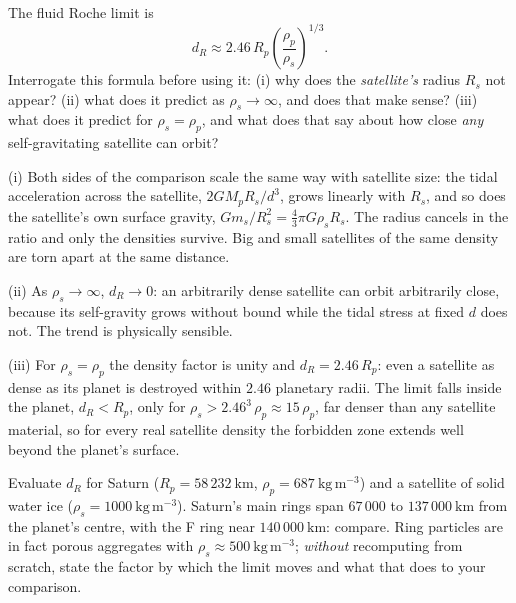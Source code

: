 \parti The fluid Roche limit is
\[
  d_R \approx 2.46\, R_p \left(\frac{\rho_p}{\rho_s}\right)^{1/3}.
\]
Interrogate this formula before using it: (i) why does the \emph{satellite's} radius $R_s$ not
appear? (ii) what does it predict as $\rho_s \to \infty$, and does that make sense? (iii) what
does it predict for $\rho_s = \rho_p$, and what does that say about how close \emph{any}
self-gravitating satellite can orbit?

\begin{solution}
(i) Both sides of the comparison scale the same way with satellite size: the tidal acceleration
across the satellite, $2 G M_p R_s / d^3$, grows linearly with $R_s$, and so does the satellite's
own surface gravity, $G m_s / R_s^2 = \tfrac{4}{3}\pi G \rho_s R_s$. The radius cancels in the
ratio and only the densities survive. Big and small satellites of the same density are torn apart
at the same distance.

(ii) As $\rho_s \to \infty$, $d_R \to 0$: an arbitrarily dense satellite can orbit arbitrarily
close, because its self-gravity grows without bound while the tidal stress at fixed $d$ does not.
The trend is physically sensible.

(iii) For $\rho_s = \rho_p$ the density factor is unity and $d_R = 2.46\,R_p$: even a satellite
as dense as its planet is destroyed within $2.46$ planetary radii. The limit falls inside the
planet, $d_R < R_p$, only for $\rho_s > 2.46^3\,\rho_p \approx 15\,\rho_p$, far denser than any
satellite material, so for every real satellite density the forbidden zone extends well beyond
the planet's surface.
\end{solution}

\parti Evaluate $d_R$ for Saturn ($R_p = 58\,232\ \mathrm{km}$,
$\rho_p = 687\ \mathrm{kg\,m^{-3}}$) and a satellite of solid water ice
($\rho_s = 1000\ \mathrm{kg\,m^{-3}}$). Saturn's
main rings span $67\,000$ to $137\,000\ \mathrm{km}$ from the planet's centre, with the F ring
near $140\,000\ \mathrm{km}$: compare. Ring particles are in fact porous aggregates with
$\rho_s \approx 500\ \mathrm{kg\,m^{-3}}$; \emph{without} recomputing from scratch, state the
factor by which the limit moves and what that does to your comparison.

